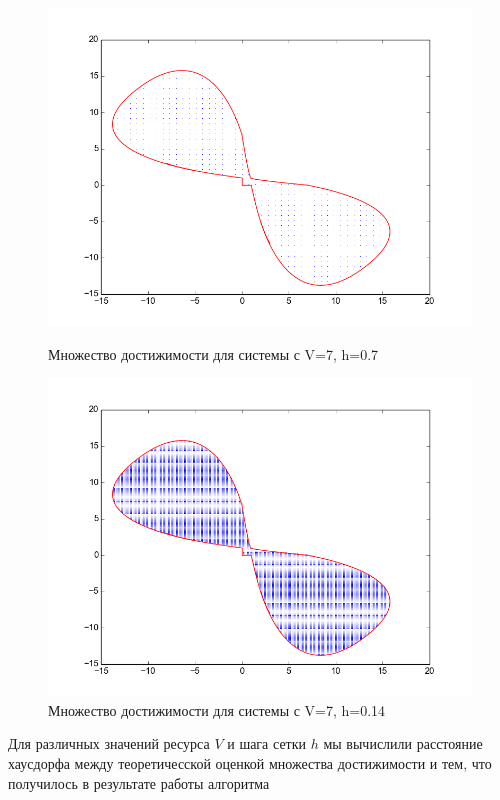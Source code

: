 \begin{figure}[h]
\begin{minipage}[h]{0.47\linewidth}
  \noindent \hfil
  \includegraphics[width=1\linewidth]{img/figure_v_7_h_07.png}
  \hfil \caption{Множество достижимости для системы с V=7, h=0.7}
  \label{fig:v71}
\end{minipage}
\hfill
\begin{minipage}[h]{0.47\linewidth}
  \noindent \hfil
  \includegraphics[width=1\linewidth]{img/figure_v_7_h_014.png}
  \hfil \caption{Множество достижимости для системы с V=7, h=0.14}
  \label{fig:v72}
\end{minipage}
\end{figure}

Для различных значений ресурса $V$ и шага сетки $h$ мы вычислили
расстояние хаусдорфа между теоретичесской оценкой множества
достижимости и тем, что получилось в результате работы алгоритма

